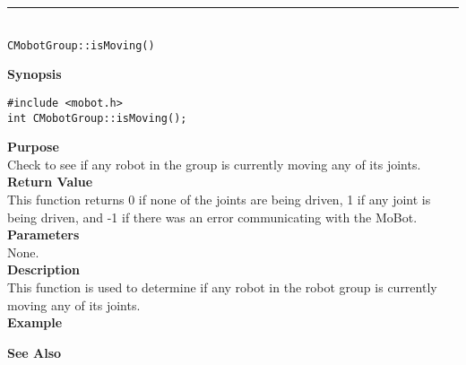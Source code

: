 \noindent
\vspace{5pt}
\rule{4.5in}{0.015in}\\
\noindent
{\LARGE \texttt{CMobotGroup::isMoving()}}\\
{}

\noindent
{\bf Synopsis}
\begin{verbatim}
#include <mobot.h>
int CMobotGroup::isMoving();
\end{verbatim}

\noindent
{\bf Purpose}\\
Check to see if any robot in the group is currently moving any of its joints.\\

\noindent
{\bf Return Value}\\
This function returns 0 if none of the joints are being driven, 1 if any joint
is being driven, and -1 if there was an error communicating with the MoBot.\\

\noindent
{\bf Parameters}\\
None.\\

\noindent
{\bf Description}\\
This function is used to determine if any robot in the robot group is currently moving any of
its joints. \\

\noindent
{\bf Example}\\
\noindent

\noindent
{\bf See Also}\\

